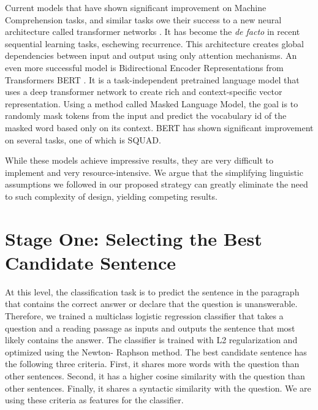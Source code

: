 Current models that have shown significant improvement on Machine Comprehension tasks, and  similar tasks owe their success to a new neural architecture called transformer networks \citep{DBLP:journals/corr/VaswaniSPUJGKP17}. It has become the \emph{de facto} in recent sequential learning tasks, eschewing recurrence. This architecture creates global dependencies between input and output using only attention mechanisms. An even more successful model is Bidirectional Encoder Representations from Transformers BERT \citep{DBLP:journals/corr/abs-1810-04805}. It is a task-independent pretrained language model that uses a deep transformer network to create rich and context-specific vector representation. Using a method called Masked Language Model, the goal is to randomly mask tokens from the input and predict the vocabulary id of the masked word based only on its context. BERT has shown significant improvement on several tasks, one of which is SQUAD. 

While these models achieve impressive results, they are very difficult to implement and very resource-intensive. We argue that the simplifying linguistic assumptions we followed in our proposed strategy can greatly eliminate the need to such complexity of design, yielding competing results. 


\section{Stage One: Selecting the Best Candidate Sentence}

At this level, the classification task is to predict the sentence in the paragraph that contains the correct answer or declare that the question is unanswerable. Therefore, we trained a multiclass logistic regression classifier that takes a question and a reading passage as inputs and outputs the sentence that most likely contains the answer. The classifier is trained with L2 regularization and optimized using the Newton- Raphson method. The best candidate sentence has the following three criteria. First, it shares more words with the question than other sentences. Second, it has a higher cosine similarity with the question than other sentences. Finally, it shares a syntactic similarity with the question. We are using these criteria as features for the classifier. 

